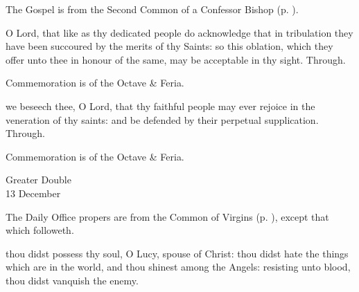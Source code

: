 \begin{rubric}
	The Gospel is from the Second Common of a Confessor Bishop (p. \pageref{CommonConfessorBishopII}).
\end{rubric}


\secret
{} O Lord, that like as thy dedicated people do acknowledge that in tribulation they have been succoured by the merits of thy Saints: so this oblation, which they offer unto thee in honour of the same, may be acceptable in thy sight. Through.

\begin{rubric}
	Commemoration is of the Octave \& Feria.
\end{rubric}


\postcommunion
{} we beseech thee, O Lord, that thy faithful people may ever rejoice in the veneration of thy saints: and be defended by their perpetual supplication. Through.

\begin{rubric}
	Commemoration is of the Octave \& Feria.
\end{rubric}


\begin{inhead}
    {Greater Double\\
13 December}
\end{inhead}

\begin{rubric}
	The Daily Office propers are from the Common of Virgins (p. \pageref{CommonVirginOnlyI}), except that which followeth.
\end{rubric}

 thou didst possess thy soul, O Lucy, spouse of Christ: thou didst hate the things which are in the world, and thou shinest among the Angels: resisting unto blood, thou didst vanquish the enemy.

\\

